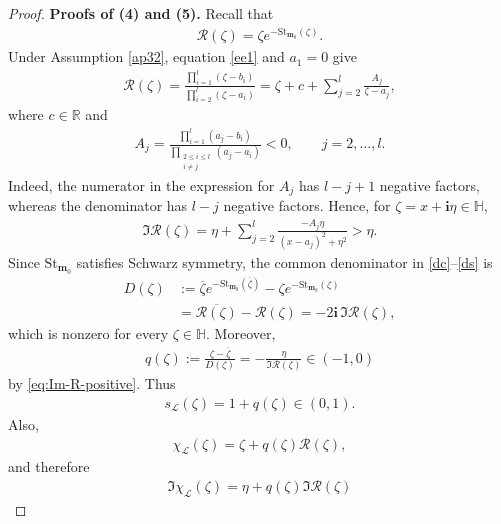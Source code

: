 \documentclass[11pt]{amsart}
\theoremstyle{plain}
\newcommand\RR{{\mathbb R}}
\newcommand\HH{{\mathbb H}}
\newcommand\bm{\mathbf{m}}
\numberwithin{equation}{section}
\numberwithin{theorem}{section}
\numberwithin{figure}{section}
\begin{document}
\begin{proof}
\bigskip
\noindent\textbf{Proofs of (4) and (5).}
Recall that
\begin{align*}
    \mathscr R(\zeta)
    =
    \zeta e^{-\mathrm{St}_{\bm_0}(\zeta)}.
\end{align*}
Under Assumption \ref{ap32}, equation \eqref{ee1} and $a_1=0$ give
\begin{align*}
    \mathscr R(\zeta)
    =
    \frac{\prod_{i=1}^{l}(\zeta-b_i)}
         {\prod_{i=2}^{l}(\zeta-a_i)}
    =
    \zeta+c+\sum_{j=2}^{l}\frac{A_j}{\zeta-a_j},
\end{align*}
where $c\in\RR$ and
\begin{align*}
    A_j
    =
    \frac{\prod_{i=1}^{l}(a_j-b_i)}
         {\prod_{\substack{2\leq i\leq l\\i\neq j}}(a_j-a_i)}
    <0,
    \qquad j=2,\ldots,l.
\end{align*}
Indeed, the numerator in the expression for $A_j$ has
$l-j+1$ negative factors, whereas the denominator has $l-j$ negative
factors.  Hence, for $\zeta=x+\mathbf i\eta\in\HH$,
\begin{align}
    \Im\mathscr R(\zeta)
    =
    \eta+
    \sum_{j=2}^{l}
    \frac{-A_j\eta}{(x-a_j)^2+\eta^2}
    >
    \eta.
    \label{eq:Im-R-positive}
\end{align}
Since $\mathrm{St}_{\bm_0}$ satisfies Schwarz symmetry, the common
denominator in \eqref{dc}--\eqref{ds} is
\begin{align*}
    D(\zeta)
    &:={}
    \overline{\zeta}
    e^{-\mathrm{St}_{\bm_0}(\overline{\zeta})}
    -
    \zeta e^{-\mathrm{St}_{\bm_0}(\zeta)}\\
    &=
    \overline{\mathscr R(\zeta)}-\mathscr R(\zeta)
    =
    -2\mathbf i\,\Im\mathscr R(\zeta),
\end{align*}
which is nonzero for every $\zeta\in\HH$.  Moreover,
\begin{align*}
    q(\zeta)
    :=
    \frac{\zeta-\overline\zeta}{D(\zeta)}
    =
    -\frac{\eta}{\Im\mathscr R(\zeta)}
    \in(-1,0)
\end{align*}
by \eqref{eq:Im-R-positive}. Thus
\begin{align*}
    s_{\mathcal L}(\zeta)=1+q(\zeta)\in(0,1).
\end{align*}
Also,
\begin{align*}
    \chi_{\mathcal L}(\zeta)
    =
    \zeta+q(\zeta)\mathscr R(\zeta),
\end{align*}
and therefore
\begin{align*}
    \Im\chi_{\mathcal L}(\zeta)
    =
    \eta+q(\zeta)\Im\mathscr R(\zeta)

\end{align*}
\end{proof}
\end{document}
